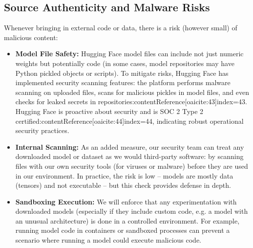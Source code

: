 \documentclass{article}
\begin{document}
\subsection*{Source Authenticity and Malware Risks}
Whenever bringing in external code or data, there is a risk (however small) of malicious content:
\begin{itemize}
    \item \textbf{Model File Safety:} Hugging Face model files can include not just numeric weights but potentially code (in some cases, model repositories may have Python pickled objects or scripts). To mitigate risks, Hugging Face has implemented security scanning features: the platform performs malware scanning on uploaded files, scans for malicious pickles in model files, and even checks for leaked secrets in repositories:contentReference[oaicite:43]{index=43}. Hugging Face is proactive about security and is SOC 2 Type 2 certified:contentReference[oaicite:44]{index=44}, indicating robust operational security practices.
    \item \textbf{Internal Scanning:} As an added measure, our security team can treat any downloaded model or dataset as we would third-party software: by scanning files with our own security tools (for viruses or malware) before they are used in our environment. In practice, the risk is low – models are mostly data (tensors) and not executable – but this check provides defense in depth.
    \item \textbf{Sandboxing Execution:} We will enforce that any experimentation with downloaded models (especially if they include custom code, e.g. a model with an unusual architecture) is done in a controlled environment. For example, running model code in containers or sandboxed processes can prevent a scenario where running a model could execute malicious code.
\end{itemize}
\end{document}
